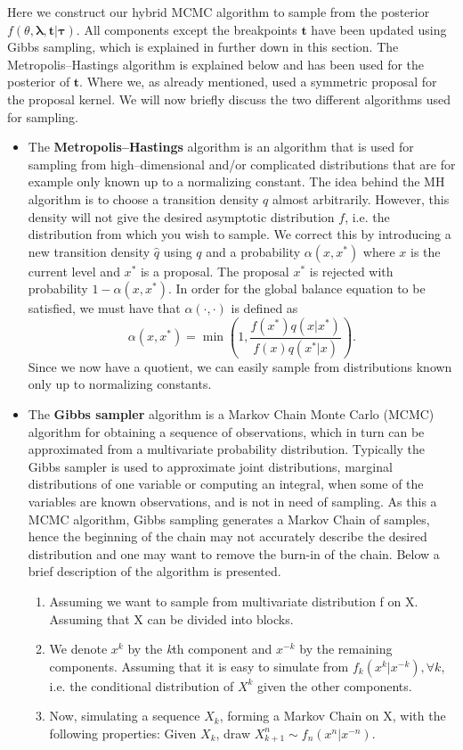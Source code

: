 Here we construct our hybrid MCMC algorithm to sample from the posterior $f(\theta,\boldsymbol{\lambda},\boldsymbol{t}|\boldsymbol{\tau})$. All components except the breakpoints $\boldsymbol{t}$ have been updated using Gibbs sampling, which is explained in further down in this section. The Metropolis--Hastings algorithm is explained below and has been used for the posterior of $\boldsymbol{t}$. Where we, as already mentioned, used a symmetric proposal for the proposal kernel. We will now briefly discuss the two different algorithms used for sampling.
\begin{itemize}
\item The \textbf{Metropolis--Hastings} algorithm is an algorithm that is used for sampling from high--dimensional and/or complicated distributions that are for example only known up to a normalizing constant. The idea behind the MH algorithm is to choose a transition density $q$ almost arbitrarily. However, this density will not give the desired asymptotic distribution $f$, i.e. the distribution from which you wish to sample. We correct this by introducing a new transition density $\hat{q}$ using $q$ and a probability $\alpha(x,x^*)$ where $x$ is the current level and $x^*$ is a proposal. The proposal $x^*$ is rejected with probability $1 - \alpha(x,x^*)$. In order for the global balance equation to be satisfied, we must have that $\alpha(\cdot,\cdot)$ is defined as 
\[\alpha(x,x^*) = \min \left ( 1, \frac{f(x^*)q(x|x^*)}{f(x)q(x^*|x )} \right ) .\]
Since we now have a quotient, we can easily sample from distributions known only up to normalizing constants.

\item The \textbf{Gibbs sampler} algorithm is a Markov Chain Monte Carlo (MCMC) algorithm for obtaining a sequence of observations, which in turn can be approximated from a multivariate probability distribution. Typically the Gibbs sampler is used to approximate joint distributions, marginal distributions of one variable or computing an integral, when some of the variables are known observations, and is not in need of sampling. As this a MCMC algorithm, Gibbs sampling generates a Markov Chain of samples, hence the beginning of the chain may not accurately describe the desired distribution and one may want to remove the burn-in of the chain. Below a brief description of the algorithm is presented.

\begin{enumerate}
	\item{Assuming we want to sample from multivariate distribution f on X. Assuming that X can be divided into blocks.}
	\item{We denote $x^k$ by the \textit{k}th component and $x^{-k}$ by the remaining components. Assuming that it is easy to simulate from $f_k(x^k|x^{-k}),\forall k$, i.e. the conditional distribution of $X^k$ given the other components.}
	\item{Now, simulating a sequence $X_k$, forming a Markov Chain on X, with the following properties: Given $X_k$, draw $X_{k+1}^n \sim f_n(x^n|x^{-n})$.}
\end{enumerate}

\end{itemize}
